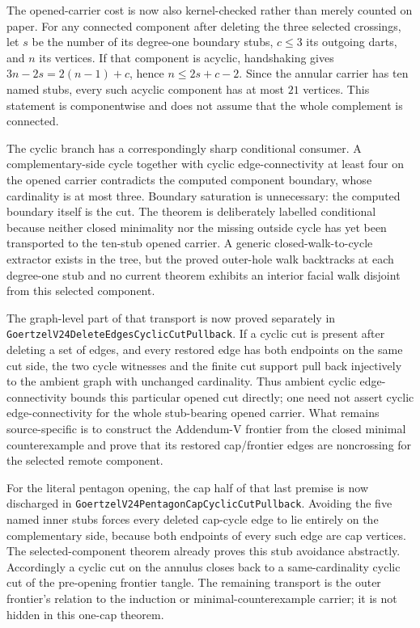 \documentclass[11pt]{article}
\theoremstyle{definition}
\begin{document}
The opened-carrier cost is now also kernel-checked rather than merely
counted on paper.  For any connected component after deleting the three
selected crossings, let \(s\) be the number of its degree-one boundary
stubs, \(c\leq 3\) its outgoing darts, and \(n\) its vertices.  If that
component is acyclic, handshaking gives
\(3n-2s=2(n-1)+c\), hence \(n\leq 2s+c-2\).  Since the annular carrier has
ten named stubs, every such acyclic component has at most \(21\) vertices.
This statement is componentwise and does not assume that the whole
complement is connected.

The cyclic branch has a correspondingly sharp conditional consumer.  A
complementary-side cycle together with cyclic edge-connectivity at least four
on the opened carrier contradicts the computed component boundary, whose
cardinality is at most three.  Boundary saturation is unnecessary: the
computed boundary itself is the cut.  The theorem is deliberately labelled
conditional because neither closed minimality nor the missing outside cycle
has yet been transported to the ten-stub opened carrier.  A generic
closed-walk-to-cycle extractor exists in the tree, but the proved outer-hole
walk backtracks at each degree-one stub and no current theorem exhibits an
interior facial walk disjoint from this selected component.

The graph-level part of that transport is now proved separately in
\texttt{GoertzelV24DeleteEdgesCyclicCutPullback}.  If a cyclic cut is
present after deleting a set of edges, and every restored edge has both
endpoints on the same cut side, the two cycle witnesses and the finite cut
support pull back injectively to the ambient graph with unchanged
cardinality.  Thus ambient cyclic edge-connectivity bounds this particular
opened cut directly; one need not assert cyclic edge-connectivity for the
whole stub-bearing opened carrier.  What remains source-specific is to
construct the Addendum-V frontier from the closed minimal counterexample and
prove that its restored cap/frontier edges are noncrossing for the selected
remote component.

For the literal pentagon opening, the cap half of that last premise is now
discharged in \texttt{GoertzelV24PentagonCapCyclicCutPullback}.  Avoiding the
five named inner stubs forces every deleted cap-cycle edge to lie entirely
on the complementary side, because both endpoints of every such edge are
cap vertices.  The selected-component theorem already proves this stub
avoidance abstractly.  Accordingly a cyclic cut on the annulus closes back
to a same-cardinality cyclic cut of the pre-opening frontier tangle.  The
remaining transport is the outer frontier's relation to the induction or
minimal-counterexample carrier; it is not hidden in this one-cap theorem.
\end{document}

